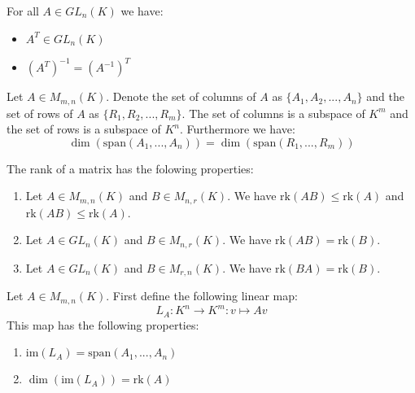 	\begin{property}
		For all $A\in GL_n(K)$ we have:
	        \begin{itemize}
			\item $A^T\in GL_n(K)$
		        \item $\left(A^T\right)^{-1}=\left(A^{-1}\right)^T$
		\end{itemize}
	\end{property}
    
	\begin{property}\label{linalgebra:dim_columns_rows}
		Let $A\in M_{m,n}(K)$. Denote the set of columns of $A$ as $\{A_1, A_2, ..., A_n\}$ and the set of rows of $A$ as $\{R_1, R_2, ..., R_m\}$. The set of columns is a subspace of $K^m$ and the set of rows is a subspace of $K^n$. Furthermore we have:
		\[
			\dim(\text{span}(A_1, ..., A_n)) = \dim(\text{span}(R_1, ..., R_m))
		\]
	\end{property}
	
    
	\begin{property}\label{linalgebra:rank_properties}
	        The rank of a matrix has the folowing properties:
        	\begin{enumerate}
			\item Let $A\in M_{m,n}(K)$ and $B\in M_{n,r}(K)$. We have $\text{rk}(AB)\leq\text{rk}(A)$ and $\text{rk}(AB)\leq\text{rk}(A)$.
        		\item Let $A\in GL_n(K)$ and $B\in M_{n,r}(K)$. We have $\text{rk}(AB)=\text{rk}(B)$.
		        \item Let $A\in GL_n(K)$ and $B\in M_{r,n}(K)$. We have $\text{rk}(BA)=\text{rk}(B)$.
		\end{enumerate}
	\end{property}
	\begin{property}\label{linalgebra:dim_matrix_left_multiplication}
	        Let $A\in M_{m,n}(K)$. First define the following linear map:
        	\begin{equation}
			\label{linalgebra:matrix_left_multiplication}
        		\boxed{L_A:K^n\rightarrow K^m:v\mapsto Av}
		\end{equation}
	        This map has the following properties:
        	\begin{enumerate}
        		\item $\text{im}(L_A) = \text{span}(A_1, ..., A_n)$
			\item $\dim(\text{im}(L_A))=\text{rk}(A)$
		\end{enumerate}
	\end{property}
    
